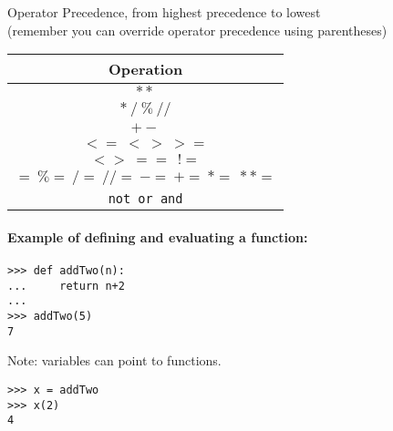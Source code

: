 \documentclass[11pt]{article}
\begin{document}
\begin{center}
\bigskip

Operator Precedence, from highest precedence to lowest\\
(remember you can override operator precedence using parentheses)

\bigskip

\begin{tabular}{|c|}
\hline
Operation\\
\hline
$**$ \\
\hline
$*\ /\ \%\ //$ \\
\hline
$+ -$ \\
\hline
$<=\ <\ >\ >=$ \\
\hline
$<>\ ==\ \ !=$ \\
\hline
$=\ \%=\ /=\ //=\ -=\ +=\ *=\ **=$ \\
\hline
\texttt{not or and}\\
\hline
\end{tabular}
\end{center}

\paragraph{Example of defining and evaluating a function:}

\bigskip

\begin{verbatim}
>>> def addTwo(n):
...     return n+2
... 
>>> addTwo(5)
7
\end{verbatim}

\noindent Note: variables can point to functions.

\begin{verbatim}
>>> x = addTwo
>>> x(2)
4
\end{verbatim}
\end{document}
